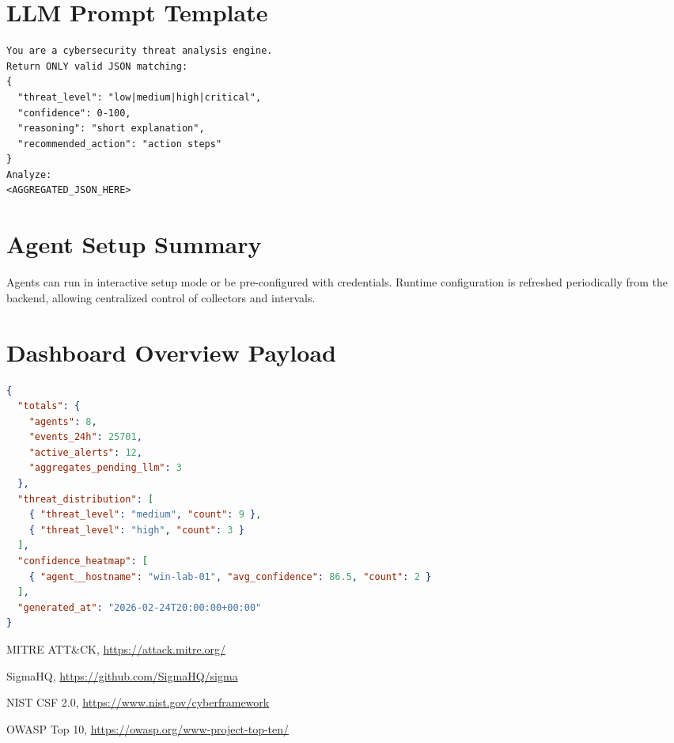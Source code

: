 \documentclass[conference]{IEEEtran}
\begin{document}
\section{LLM Prompt Template}
\begin{lstlisting}[caption={LLM analysis prompt template (simplified)}]
You are a cybersecurity threat analysis engine.
Return ONLY valid JSON matching:
{
  "threat_level": "low|medium|high|critical",
  "confidence": 0-100,
  "reasoning": "short explanation",
  "recommended_action": "action steps"
}
Analyze:
<AGGREGATED_JSON_HERE>
\end{lstlisting}

\section{Agent Setup Summary}
Agents can run in interactive setup mode or be pre-configured with credentials. Runtime configuration is refreshed periodically from the backend, allowing centralized control of collectors and intervals.

\section{Dashboard Overview Payload}
\begin{lstlisting}[language=json,caption={Dashboard overview response}]
{
  "totals": {
    "agents": 8,
    "events_24h": 25701,
    "active_alerts": 12,
    "aggregates_pending_llm": 3
  },
  "threat_distribution": [
    { "threat_level": "medium", "count": 9 },
    { "threat_level": "high", "count": 3 }
  ],
  "confidence_heatmap": [
    { "agent__hostname": "win-lab-01", "avg_confidence": 86.5, "count": 2 }
  ],
  "generated_at": "2026-02-24T20:00:00+00:00"
}
\end{lstlisting}

\renewcommand{\refname}{References}
\begin{thebibliography}{9}
MITRE ATT\&CK, \url{https://attack.mitre.org/}

SigmaHQ, \url{https://github.com/SigmaHQ/sigma}

NIST CSF 2.0, \url{https://www.nist.gov/cyberframework}

OWASP Top 10, \url{https://owasp.org/www-project-top-ten/}
\end{thebibliography}
\end{document}
